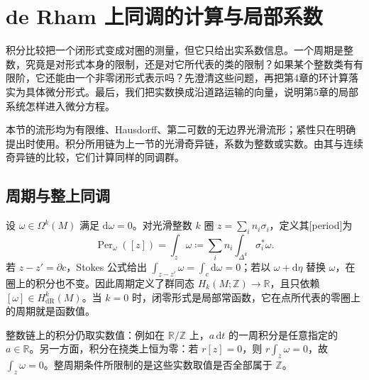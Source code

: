 
% 
% 
% 

\section{de Rham 上同调的计算与局部系数}
\label{g2:sec:0704}

积分比较把一个闭形式变成对圈的测量，但它只给出实系数信息。一个周期是整数，究竟是对形式本身的限制，还是对它所代表的类的限制？如果某个整数类有有限阶，它还能由一个非零闭形式表示吗？先澄清这些问题，再把第4章的环计算落实为具体微分形式。最后，我们把实数换成沿道路运输的向量，说明第5章的局部系统怎样进入微分方程。

本节的流形均为有限维、Hausdorff、第二可数的无边界光滑流形；紧性只在明确提出时使用。积分所用链为上一节的光滑奇异链，系数为整数或实数。由其与连续奇异链的比较，它们计算同样的同调群。

\subsection{周期与整上同调}
\label{g2:subsec:0704:01}
设 \(\omega\in\Omega^k(M)\) 满足 \(\mathrm d\omega=0\)。对光滑整数 \(k\) 圈 \(z=\sum_i n_i\sigma_i\)，定义其[period]为
\[
	\operatorname{Per}_{\omega}([z])=\int_z\omega
	\coloneqq\sum_i n_i\int_{\Delta^k}\sigma_i^*\omega.
\]
若 \(z-z'=\partial c\)，Stokes 公式给出 \(\int_{z-z'}\omega=\int_c\mathrm d\omega=0\)；若以 \(\omega+\mathrm d\eta\) 替换 \(\omega\)，在圈上的积分也不变。因此周期定义了群同态 \(H_k(M;\mathbb Z)\to\mathbb R\)，且只依赖 \([\omega]\in H^k_{\mathrm{dR}}(M)\)。当 \(k=0\) 时，闭零形式是局部常函数，它在点所代表的零圈上的周期就是函数值。

整数链上的积分仍取实数值：例如在 \(\mathbb R/\mathbb Z\) 上，\(a\,\mathrm dt\) 的一周积分是任意指定的 \(a\in\mathbb R\)。另一方面，积分在挠类上恒为零：若 \(r[z]=0\)，则 \(r\int_z\omega=0\)，故 \(\int_z\omega=0\)。整周期条件所限制的是这些实数取值是否全部属于 \(\mathbb Z\)。


